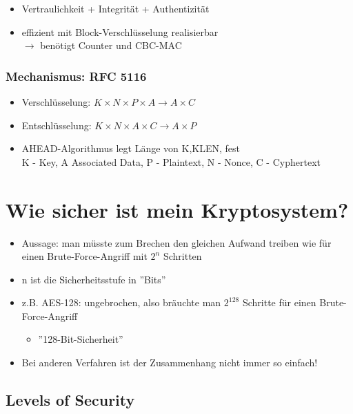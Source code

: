 \documentclass[openany]{book}
\begin{document}
\begin{itemize}
    \item Vertraulichkeit + Integrität + Authentizität
    \item effizient mit Block-Verschlüsselung realisierbar \\ $\rightarrow$ benötigt Counter und CBC-MAC
\end{itemize}

\subsubsection{Mechanismus: RFC 5116}

\begin{itemize}
    \item Verschlüsselung: $K\times N\times P\times A \rightarrow A\times C$
    \item Entschlüsselung: $K\times N\times A\times C \rightarrow A\times P$
    \item AHEAD-Algorithmus legt Länge von K,K\textunderscore LEN, fest \\ K - Key, A Associated Data, P - Plaintext, N - Nonce, C - Cyphertext
\end{itemize}

\section{Wie sicher ist mein Kryptosystem?}

\begin{itemize}
    \item Aussage: man müsste zum Brechen den gleichen Aufwand treiben wie für einen Brute-Force-Angriff mit $2^n$ Schritten
    \item n ist die Sicherheitsstufe in ''Bits''
    \item z.B. AES-128: ungebrochen, also bräuchte man $2^128$ Schritte für einen Brute-Force-Angriff
    \begin{itemize}
        \item ''128-Bit-Sicherheit''
    \end{itemize}
    \item Bei anderen Verfahren ist der Zusammenhang nicht immer so einfach!
\end{itemize}

\subsection{Levels of Security}
\end{document}

